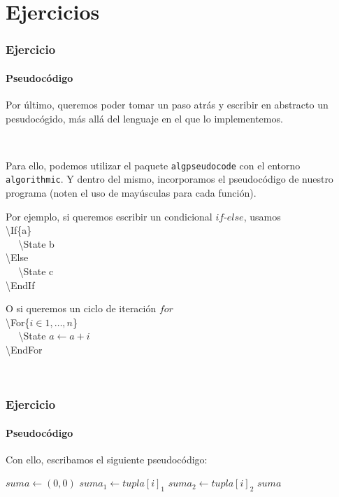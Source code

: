 \section{Ejercicios}\label{ejercicios}

\begin{frame}
\frametitle{Ejercicio}
\framesubtitle{Pseudocódigo}

Por último, queremos poder tomar un paso atrás y escribir en abstracto un pesudocógido, más allá del lenguaje en el que lo implementemos.

\

Para ello, podemos utilizar el paquete \texttt{algpseudocode} con el entorno \texttt{algorithmic}. Y dentro del mismo, incorporamos el pseudocódigo de nuestro programa (noten el uso de mayúsculas para cada función).

\begin{multicols}{2}

Por ejemplo, si queremos escribir un condicional $if$-$else$, usamos \\

\textbackslash If\{a\} \\
$~~~~~~$\textbackslash State b \\
\textbackslash Else \\
$~~~~~~$\textbackslash State c \\
\textbackslash EndIf \\

\pause

O si queremos un ciclo de iteración $for$ \\

\textbackslash For\{$i \in 1,\ldots,n$\} \\
$~~~~~~$\textbackslash State $a \gets a + i$ \\
\textbackslash EndFor

\

\end{multicols}
\end{frame}

\begin{frame}
\frametitle{Ejercicio}
\framesubtitle{Pseudocódigo}

Con ello, escribamos el siguiente pseudocódigo:

\begin{tcolorbox}[colframe=color1]
\begin{center}
\begin{algorithmic}
        \State $suma \gets (0,0)$
            \State $suma_1 \gets tupla[i]_1$
            \State $suma_2 \gets tupla[i]_2$
        \EndFor
        \EndIf
        \State \Return $suma$
    \EndFunction
\end{algorithmic}
\end{center}
\end{tcolorbox}

\end{frame}